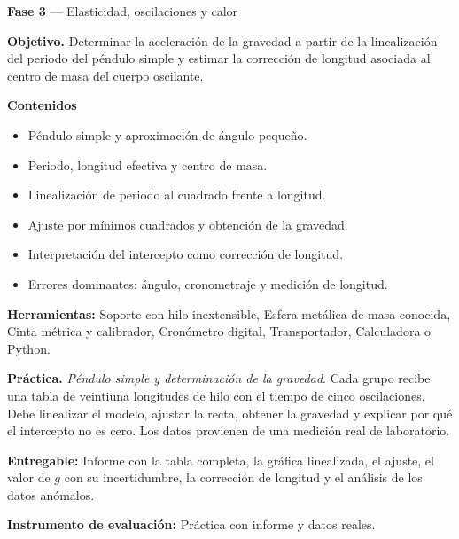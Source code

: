 \documentclass[11pt,a4paper]{article}
\begin{document}
\begin{tcolorbox}[cajaContenido,title={Semana 9 --- Péndulo simple y determinación de la gravedad}]
\textbf{Fase 3} --- Elasticidad, oscilaciones y calor

\textbf{Objetivo.} Determinar la aceleración de la gravedad a partir de la linealización del periodo del péndulo simple y estimar la corrección de longitud asociada al centro de masa del cuerpo oscilante.

\textbf{Contenidos}

\begin{itemize}[leftmargin=1.4em,itemsep=2pt,topsep=3pt]
  \item Péndulo simple y aproximación de ángulo pequeño.
  \item Periodo, longitud efectiva y centro de masa.
  \item Linealización de periodo al cuadrado frente a longitud.
  \item Ajuste por mínimos cuadrados y obtención de la gravedad.
  \item Interpretación del intercepto como corrección de longitud.
  \item Errores dominantes: ángulo, cronometraje y medición de longitud.
\end{itemize}

\textbf{Herramientas:} Soporte con hilo inextensible, Esfera metálica de masa conocida, Cinta métrica y calibrador, Cronómetro digital, Transportador, Calculadora o Python.

\textbf{Práctica.} \emph{Péndulo simple y determinación de la gravedad}. Cada grupo recibe una tabla de veintiuna longitudes de hilo con el tiempo de cinco oscilaciones. Debe linealizar el modelo, ajustar la recta, obtener la gravedad y explicar por qué el intercepto no es cero. Los datos provienen de una medición real de laboratorio.

\textbf{Entregable:} Informe con la tabla completa, la gráfica linealizada, el ajuste, el valor de $g$ con su incertidumbre, la corrección de longitud y el análisis de los datos anómalos.

\textbf{Instrumento de evaluación:} Práctica con informe y datos reales.
\end{tcolorbox}
\end{document}
